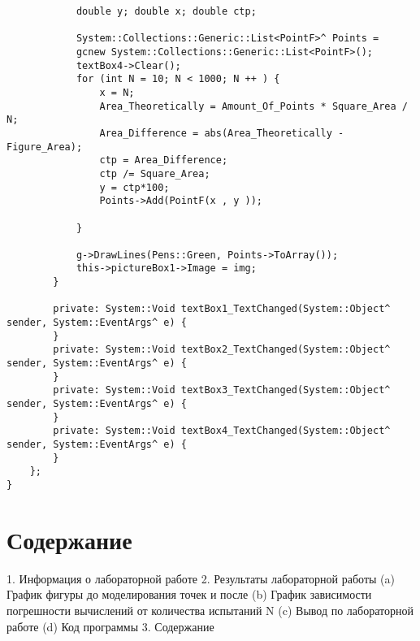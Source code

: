 \documentclass[a4paper,12pt]{article}
\begin{document}
\begin{verbatim}
			double y; double x; double ctp;
			
			System::Collections::Generic::List<PointF>^ Points =	
			gcnew System::Collections::Generic::List<PointF>(); 
			textBox4->Clear();
			for (int N = 10; N < 1000; N ++ ) {	
				x = N;
				Area_Theoretically = Amount_Of_Points * Square_Area / N;
				Area_Difference = abs(Area_Theoretically - Figure_Area);
				ctp = Area_Difference;
				ctp /= Square_Area;
				y = ctp*100;	
				Points->Add(PointF(x , y ));
				
			}
			
			g->DrawLines(Pens::Green, Points->ToArray()); 
			this->pictureBox1->Image = img; 
		}
		
		private: System::Void textBox1_TextChanged(System::Object^ sender, System::EventArgs^ e) {
		}
		private: System::Void textBox2_TextChanged(System::Object^ sender, System::EventArgs^ e) {
		}
		private: System::Void textBox3_TextChanged(System::Object^ sender, System::EventArgs^ e) {
		}
		private: System::Void textBox4_TextChanged(System::Object^ sender, System::EventArgs^ e) {
		}
	};
}
\end{verbatim}

\section{Содержание}
	1. Информация о лабораторной работе
	2. Результаты лабораторной работы
	(a) График фигуры до моделирования точек и после 
	(b) График зависимости погрешности вычислений от количества
	испытаний N
	(c) Вывод по лабораторной работе
	(d) Код программы
	3. Содержание
\tableofcontents
	
\clearpage
\end{document}

